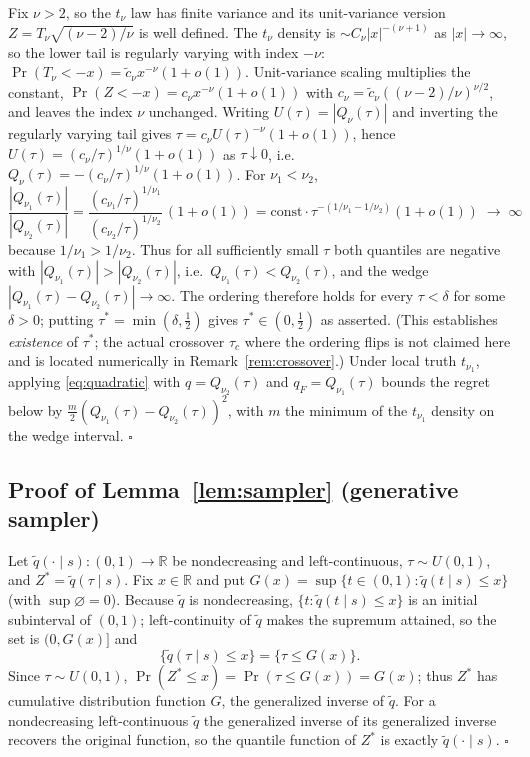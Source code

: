 \documentclass[11pt]{article}
\theoremstyle{remark}
\begin{document}
Fix $\nu>2$, so the $t_\nu$ law has finite variance and its
unit-variance version $Z=T_\nu\sqrt{(\nu-2)/\nu}$ is well defined. The
$t_\nu$ density is $\sim C_\nu|x|^{-(\nu+1)}$ as $|x|\to\infty$, so the
lower tail is regularly varying with index $-\nu$: $\Pr(T_\nu<-x)=
\tilde c_\nu x^{-\nu}(1+o(1))$. Unit-variance scaling multiplies the
constant, $\Pr(Z<-x)=c_\nu x^{-\nu}(1+o(1))$ with
$c_\nu=\tilde c_\nu((\nu-2)/\nu)^{\nu/2}$, and leaves the index $\nu$
unchanged. Writing $U(\tau)=|Q_\nu(\tau)|$ and inverting the regularly
varying tail \citep{embrechts1997} gives $\tau=c_\nu U(\tau)^{-\nu}
(1+o(1))$, hence $U(\tau)=(c_\nu/\tau)^{1/\nu}(1+o(1))$ as
$\tau\downarrow0$, i.e.\ $Q_\nu(\tau)=-(c_\nu/\tau)^{1/\nu}(1+o(1))$.
For $\nu_1<\nu_2$,
\[
\frac{|Q_{\nu_1}(\tau)|}{|Q_{\nu_2}(\tau)|}
=\frac{(c_{\nu_1}/\tau)^{1/\nu_1}}{(c_{\nu_2}/\tau)^{1/\nu_2}}\,(1+o(1))
=\text{const}\cdot\tau^{-(1/\nu_1-1/\nu_2)}(1+o(1))\;\longrightarrow\;\infty
\]
because $1/\nu_1>1/\nu_2$. Thus for all sufficiently small $\tau$ both
quantiles are negative with $|Q_{\nu_1}(\tau)|>|Q_{\nu_2}(\tau)|$, i.e.\
$Q_{\nu_1}(\tau)<Q_{\nu_2}(\tau)$, and the wedge
$|Q_{\nu_1}(\tau)-Q_{\nu_2}(\tau)|\to\infty$. The ordering therefore
holds for every $\tau<\delta$ for some $\delta>0$; putting
$\tau^*=\min(\delta,\tfrac12)$ gives $\tau^*\in(0,\tfrac12)$ as
asserted. (This establishes \emph{existence} of $\tau^*$; the actual
crossover $\tau_c$ where the ordering flips is not claimed here and is
located numerically in Remark~\ref{rem:crossover}.) Under local truth
$t_{\nu_1}$, applying \eqref{eq:quadratic} with $q=Q_{\nu_2}(\tau)$ and
$q_F=Q_{\nu_1}(\tau)$ bounds the regret below by
$\tfrac{m}{2}(Q_{\nu_1}(\tau)-Q_{\nu_2}(\tau))^2$, with $m$ the minimum
of the $t_{\nu_1}$ density on the wedge interval. \hfill$\square$

\subsection*{Proof of Lemma~\ref{lem:sampler} (generative sampler)}

Let $\widetilde q(\cdot\mid s):(0,1)\to\mathbb{R}$ be nondecreasing and
left-continuous, $\tau\sim U(0,1)$, and $Z^*=\widetilde q(\tau\mid s)$.
Fix $x\in\mathbb{R}$ and put $G(x)=\sup\{t\in(0,1):\widetilde q(t\mid
s)\le x\}$ (with $\sup\varnothing=0$). Because $\widetilde q$ is
nondecreasing, $\{t:\widetilde q(t\mid s)\le x\}$ is an initial
subinterval of $(0,1)$; left-continuity of $\widetilde q$ makes the
supremum attained, so the set is $(0,G(x)]$ and
\[
\{\widetilde q(\tau\mid s)\le x\}=\{\tau\le G(x)\}.
\]
Since $\tau\sim U(0,1)$, $\Pr(Z^*\le x)=\Pr(\tau\le G(x))=G(x)$; thus
$Z^*$ has cumulative distribution function $G$, the generalized inverse
of $\widetilde q$. For a nondecreasing left-continuous $\widetilde q$
the generalized inverse of its generalized inverse recovers the
original function, so the quantile function of $Z^*$ is exactly
$\widetilde q(\cdot\mid s)$. \hfill$\square$
\end{document}
